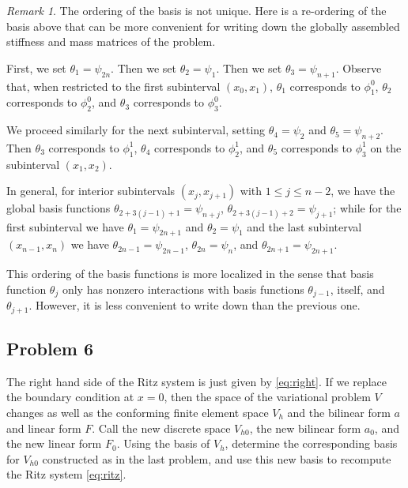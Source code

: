 \documentclass{article}
\theoremstyle{definition}
\theoremstyle{plain}
\theoremstyle{remark}
\newtheorem{remark}{Remark}
\begin{document}
\begin{remark}
  The ordering of the basis is not unique. 
  Here is a re-ordering of the basis above that can be more convenient for writing down the globally assembled stiffness and mass matrices of the problem.

  First, we set $\theta_1 = \psi_{2n}$.
  Then we set $\theta_2 = \psi_1$.
  Then we set $\theta_3 = \psi_{n+1}$.
  Observe that, when restricted to the first subinterval $(x_0,x_1)$, $\theta_1$ corresponds to $\phi_1^0$, $\theta_2$ corresponds to $\phi_2^0$, and $\theta_3$ corresponds to $\phi_3^0$.

  We proceed similarly for the next subinterval, setting $\theta_4 = \psi_2$ and $\theta_5 = \psi_{n+2}$.
  Then $\theta_3$ corresponds to $\phi_1^1$, $\theta_4$ corresponds to $\phi_2^1$, and $\theta_5$ corresponds to $\phi_3^1$ on the subinterval $(x_1,x_2)$.

  In general, for interior subintervals $(x_j,x_{j+1})$ with $1 \leq j \leq n-2$, we have the global basis functions $\theta_{2 + 3(j-1) + 1} = \psi_{n+j}$, $\theta_{2 + 3(j-1) + 2} = \psi_{j+1}$; while for the first subinterval we have $\theta_1 = \psi_{2n+1}$ and $\theta_2 = \psi_1$ and the last subinterval $(x_{n-1},x_n)$ we have $\theta_{2n-1} = \psi_{2n-1}$, $\theta_{2n} = \psi_n$, and $\theta_{2n+1} = \psi_{2n+1}$.

  This ordering of the basis functions is more localized in the sense that basis function $\theta_j$ only has nonzero interactions with basis functions $\theta_{j-1}$, itself, and $\theta_{j+1}$.
  However, it is less convenient to write down than the previous one.
\end{remark}

\subsection{Problem 6}
The right hand side of the Ritz system is just given by \eqref{eq:right}.
If we replace the boundary condition at $x = 0$, then the space of the variational problem $V$ changes as well as the conforming finite element space $V_h$ and the bilinear form $a$ and linear form $F$.
Call the new discrete space $V_{h0}$, the new bilinear form $a_0$, and the new linear form $F_0$.
Using the basis of $V_h$, determine the corresponding basis for $V_{h0}$ constructed as in the last problem, and use this new basis to recompute the Ritz system \eqref{eq:ritz}.
\end{document}

